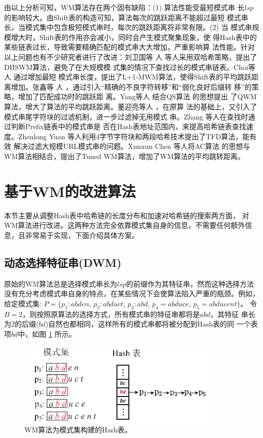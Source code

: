 由以上分析可知，WM算法存在两个固有缺陷：(1) 算法性能受最短模式串
长$lsp$的影响较大。由Shift表的构造可知，算法每次的跳跃距离不能超过最短
模式串长，当模式集中包含极短模式串时，每次的跳跃距离将非常有限。(2) 当
模式串规模增大时，Shift表的作用亦会减小，同时会产生模式聚集现象，使
得Hash表中的某些链表过长，导致需要精确匹配的模式串大大增加，严重影响算
法性能。针对以上问题也有不少研究者进行了改进：刘卫国等
人 \cite{Liu2011} 等人采用双哈希策略，提出了DHSWM算法，避免了在大规模模
式集的情况下查找过长的模式串链表。Choi等人\cite{Choi2011} 通过增加最短
模式串长度，提出了L+1-MWM算法，使得Shift表的平均跳跃距离增加。张鑫等
人 \cite{Zhang2003}，通过引入“精确的不良字符转移”和“弱化良好后缀转
移”的策略，增加了匹配成功时的跳跃距
离。Yang等人\cite{Hong2007} 结合QS算法 \cite{Sunday1990} 的思想提出
了QWM算法，增大了算法的平均跳跃距离。董迎亮等人 \cite{Dong2011}，在原算
法的基础上，又引入了模式串尾字符块的过滤机制，进一步过滤掉无用模式
串。Zhang \cite{Zhang2009b} 等人在查找时通过判断Prefix链表中的模式串是
否在Hash表地址范围内，来提高哈希链表查找速度。Zhenlong Yuan
\cite{Yuan2013} 等人利用4字节字符块和两段哈希技术提出了TFD算法，能有效
解决过滤大规模URL模式串的问题。Xunxun Chen \cite{Chen2005} 等人将AC算法
的思想与WM算法相结合，提出了Tuned WM算法，增加了WM算法的平均跳转距离。


\section{基于WM的改进算法}
\label{sec:5_DWM+}

本节主要从调整Hash表中哈希链的长度分布和加速对哈希链的搜索两方面，
对WM算法进行改进。这两种方法完全依靠模式集自身的信息，不需要任何额外信
息，且非常易于实现，下面介绍具体方案。

\subsection{动态选择特征串(DWM)}
\label{sec:5_DWM
}

原始的WM算法总是选择模式串长为$lsp$的前缀作为其特征串，然而这种选择方法
没有充分考虑模式串自身的特点，在某些情况下会使算法陷入严重的瓶颈。例如，
给定模式集:
$P=\{p_1:abden,\, p_2:abduct,\, p_3:abd,\, p_4=abduce,\,
p_5=abducent\}$。
令$B=2$，则按照原算法的选择方式，所有模式串的特征串都将是$abd$，其特征
串长为2的后缀($bd$)自然也都相同，这样所有的模式串都将被分配到Hash表的同
一个表项$bd$中，如图 \ref{fig:WM_hash_table1} 所示。


\begin{figure}[H]
  \centering
  \includegraphics[height=4cm ,width=10cm]{figures/5_WM/WM_hash_table1.eps}
  \caption{WM算法为模式集构建的Hash表。}
  \label{fig:WM_hash_table1}
\end{figure}

